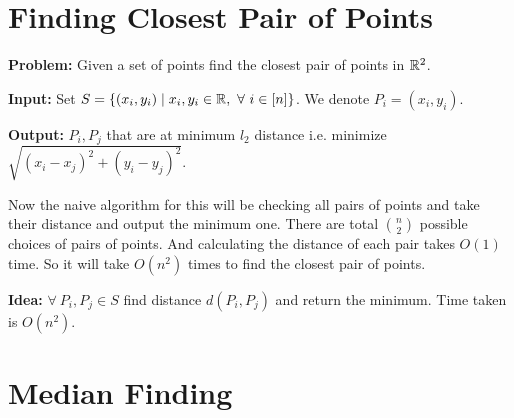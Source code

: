 \chapter{Finding Closest Pair of Points}

\parinf

\textbf{{Problem}:}  Given a set of points find the closest pair of points  in $\mathbb{R}^2$. 

\textbf{Input:} Set $S=\{(x_i,y_i)\mid x_i,y_i\in\bbR, \ \forall\ i\in[n]\}$. We denote $P_i=(x_i,y_i)$. 

\textbf{Output:} $P_i,P_j$ that are at minimum $l_2$ distance i.e. minimize $\sqrt{(x_i-x_j)^2+(y_i-y_j)^2}$. 

\parinn

Now the naive algorithm for this will be checking all pairs of points and take their distance and output the minimum one. There are total $\binom{n }{2}$ possible choices of pairs of points. And calculating the distance of each pair takes $O(1)$ time. So it will take $O(n^2)$ times to find the closest pair of points. \parinf

\textbf{Idea:} $\forall\ P_i,P_j\in S$ find distance $d(P_i,P_j)$ and return the minimum. Time taken is $O(n^2)$. 


\chapter{Median Finding}